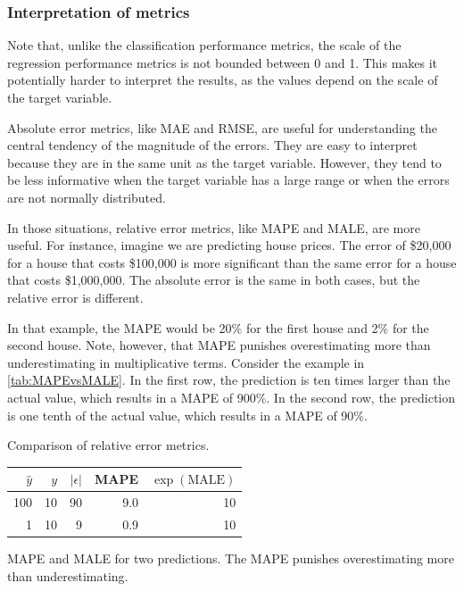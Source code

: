 \subsubsection{Interpretation of metrics}

Note that, unlike the classification performance metrics, the scale of the regression
performance metrics is not bounded between 0 and 1.  This makes it potentially harder to interpret
the results, as the values depend on the scale of the target variable.

Absolute error metrics, like MAE and RMSE, are useful for understanding the central tendency
of the magnitude of the errors.  They are easy to interpret because they are in the same
unit as the target variable.  However, they tend to be less informative when the target
variable has a large range or when the errors are not normally distributed.

In those situations, relative error metrics, like MAPE and MALE, are more useful.  For
instance, imagine we are predicting house prices.  The error of \$20,000
for a house that costs \$100,000 is more significant than the same error for a house that
costs \$1,000,000.  The absolute error is the same in both cases, but the relative error
is different.

In that example, the MAPE would be 20\% for the first house and 2\% for the second house.
Note, however, that MAPE punishes overestimating more than underestimating in
multiplicative terms.  Consider the example in \cref{tab:MAPEvsMALE}.  In the first row,
the prediction is ten times larger than the actual value, which results in a MAPE of
900\%.  In the second row, the prediction is one tenth of the actual value, which results
in a MAPE of 90\%.

\begin{tablebox}[label=tab:MAPEvsMALE]{Comparison of relative error metrics.}
  \centering
  \begin{tabular}{r r r r r}
    \toprule
    $\hat{y}$ & $y$ & $|\epsilon|$ & MAPE & $\exp(\text{MALE})$ \\
    \midrule
    100 & 10 & 90 & 9.0 & 10 \\
      1 & 10 &  9 & 0.9 & 10 \\
    \bottomrule
  \end{tabular}
  \tcblower
  MAPE and MALE for two predictions.  The MAPE punishes overestimating more than
  underestimating.
\end{tablebox}

